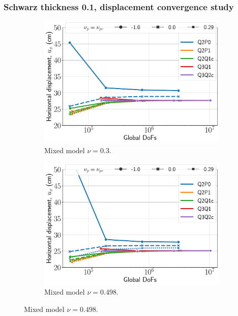 \documentclass{beamer}
\begin{document}
\begin{frame}
	\frametitle{Schwarz thickness 0.1, displacement convergence study}
	\begin{figure}[H]
		\begin{subfigure}{.5\textwidth}
			\centering
			\includegraphics[width=.8\textwidth]{../figs/u-schwarz2-mixed-0.3.pdf}
			\caption{Mixed model $\nu = 0.3$.}
		\end{subfigure}%
		\begin{subfigure}{.5\textwidth}
			\centering
			\includegraphics[width=.8\textwidth]{../figs/u-schwarz2-mixed-0.498.pdf}
			\caption{Mixed model $\nu = 0.498$.}
		\end{subfigure}
	\end{figure}
\end{frame}
\end{document}
